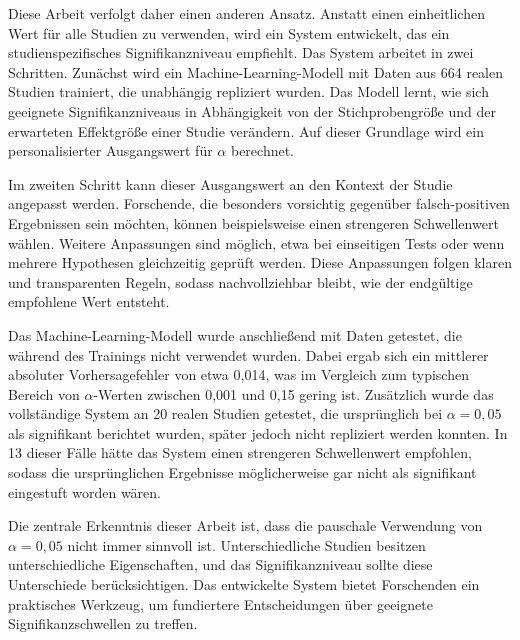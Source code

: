 Diese Arbeit verfolgt daher einen anderen Ansatz. Anstatt einen einheitlichen Wert für alle Studien zu verwenden, wird ein System entwickelt, das ein studienspezifisches Signifikanzniveau empfiehlt. Das System arbeitet in zwei Schritten. Zunächst wird ein Machine-Learning-Modell mit Daten aus 664 realen Studien trainiert, die unabhängig repliziert wurden. Das Modell lernt, wie sich geeignete Signifikanzniveaus in Abhängigkeit von der Stichprobengröße und der erwarteten Effektgröße einer Studie verändern. Auf dieser Grundlage wird ein personalisierter Ausgangswert für $\alpha$ berechnet.

Im zweiten Schritt kann dieser Ausgangswert an den Kontext der Studie angepasst werden. Forschende, die besonders vorsichtig gegenüber falsch-positiven Ergebnissen sein möchten, können beispielsweise einen strengeren Schwellenwert wählen. Weitere Anpassungen sind möglich, etwa bei einseitigen Tests oder wenn mehrere Hypothesen gleichzeitig geprüft werden. Diese Anpassungen folgen klaren und transparenten Regeln, sodass nachvollziehbar bleibt, wie der endgültige empfohlene Wert entsteht.

Das Machine-Learning-Modell wurde anschließend mit Daten getestet, die während des Trainings nicht verwendet wurden. Dabei ergab sich ein mittlerer absoluter Vorhersagefehler von etwa 0{,}014, was im Vergleich zum typischen Bereich von $\alpha$-Werten zwischen 0{,}001 und 0{,}15 gering ist. Zusätzlich wurde das vollständige System an 20 realen Studien getestet, die ursprünglich bei $\alpha = 0{,}05$ als signifikant berichtet wurden, später jedoch nicht repliziert werden konnten. In 13 dieser Fälle hätte das System einen strengeren Schwellenwert empfohlen, sodass die ursprünglichen Ergebnisse möglicherweise gar nicht als signifikant eingestuft worden wären.

Die zentrale Erkenntnis dieser Arbeit ist, dass die pauschale Verwendung von $\alpha = 0{,}05$ nicht immer sinnvoll ist. Unterschiedliche Studien besitzen unterschiedliche Eigenschaften, und das Signifikanzniveau sollte diese Unterschiede berücksichtigen. Das entwickelte System bietet Forschenden ein praktisches Werkzeug, um fundiertere Entscheidungen über geeignete Signifikanzschwellen zu treffen.
